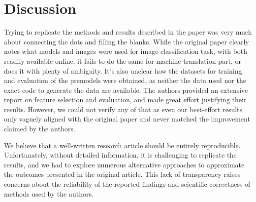 \section{Discussion}
Trying to replicate the methods and results described in the paper was very much about connecting the dots and filling the blanks. While the original paper clearly notes what models and images were used for image classification task, with both readily available online, it fails to do the same for machine translation part, or does it with plenty of ambiguity. It's also unclear how the datasets for training and evaluation of the premodels were obtained, as neither the data used nor the exact code to generate the data are available. The authors provided an extensive report on feature selection and evaluation, and made great effort justifying their results. However, we could not verify any of that as even our best-effort results only vaguely aligned with the original paper and never matched the improvement claimed by the authors.

We believe that a well-written research article should be entirely reproducible. Unfortunately, without detailed information, it is challenging to replicate the results, and we had to explore numerous alternative approaches to approximate the outcomes presented in the original article. This lack of transparency raises concerns about the reliability of the reported findings and scientific correctness of methods used by the authors.